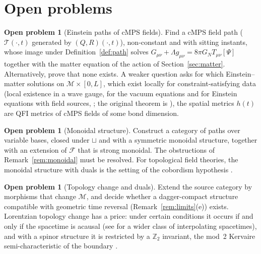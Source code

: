 \documentclass[11pt,a4paper,reqno]{amsart}
\theoremstyle{definition}
\newtheorem{problem}[theorem]{Open problem}
\numberwithin{equation}{section}
\begin{document}
\section{Open problems}
\label{sec:open}

\begin{problem}[Einstein paths of cMPS fields]\label{prob:einstein}
Find a cMPS field path ($\mathcal{T}(\cdot,t)$ generated by $(Q,R)(\cdot,t)$), non-constant and with sitting instants, whose image under Definition~\ref{def:path} solves $G_{\mu\nu}+\Lambda g_{\mu\nu}=8\pi G_NT_{\mu\nu}[\Psi]$ together with the matter equation of the action of Section~\ref{sec:matter}. Alternatively, prove that none exists. A weaker question asks for which Einstein--matter solutions on $\mathcal{M}\times[0,L]$, which exist locally for constraint-satisfying data (local existence in a wave gauge, for the vacuum equations and for Einstein equations with field sources, \cite[Ch.~VI]{choquetbruhat2009}; the original theorem is \cite{choquet1952}), the spatial metrics $h(t)$ are QFI metrics of cMPS fields of some bond dimension.
\end{problem}

\begin{problem}[Monoidal structure]
Construct a category of paths over variable bases, closed under $\sqcup$ and with a symmetric monoidal structure, together with an extension of $\mathcal{F}$ that is strong monoidal. The obstructions of Remark~\ref{rem:monoidal} must be resolved. For topological field theories, the monoidal structure with duals is the setting of the cobordism hypothesis \cite{baezdolan1995,lurie2009}.
\end{problem}

\begin{problem}[Topology change and duals]
Extend the source category by morphisms that change $\mathcal{M}$, and decide whether a dagger-compact structure \cite[Def.~2.6]{selinger2007} compatible with geometric time reversal (Remark~\ref{rem:limits}(e)) exists. Lorentzian topology change has a price: under certain conditions it occurs if and only if the spacetime is acausal \cite{geroch1967} (see \cite{borde1994} for a wider class of interpolating spacetimes), and with a spinor structure it is restricted by a $\mathbb{Z}_2$ invariant, the mod~2 Kervaire semi-characteristic of the boundary \cite{gibbonshawking1992}.
\end{problem}
\end{document}
